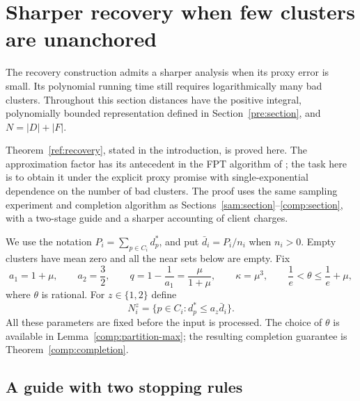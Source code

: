 \section{Sharper recovery when few clusters are unanchored}
\label{ref:section}

The recovery construction admits a sharper analysis when its proxy error is
small.  Its polynomial running time still requires logarithmically many bad
clusters.  Throughout this section distances have the positive integral,
polynomially bounded representation defined in Section~\ref{pre:section}, and
$N=|D|+|F|$.

Theorem~\ref{ref:recovery}, stated in the introduction, is proved here.
The approximation factor has its antecedent in the FPT algorithm of
\cite[Section~2.3]{CGKLL2019}; the task here is to obtain it under the
explicit proxy promise with single-exponential dependence on the number
of bad clusters.  The proof uses the same sampling experiment and
completion algorithm as Sections~\ref{sam:section}--\ref{comp:section},
with a two-stage guide and a sharper accounting of client charges.


We use the notation $P_i=\sum_{p\in C_i}d_p^*$, and put
$\bar d_i=P_i/n_i$ when $n_i>0$.  Empty clusters have mean zero and all the
near sets below are empty.  Fix
\begin{equation}\label{ref:parameters}
 a_1=1+\mu,\qquad a_2=\frac32,\qquad
 q=1-\frac1{a_1}=\frac{\mu}{1+\mu},\qquad
 \kappa=\mu^3,
 \qquad \frac1e<\theta\le\frac1e+\mu,
\end{equation}
where $\theta$ is rational.  For $z\in\{1,2\}$ define
\[
 N_i^z=\{p\in C_i:d_p^*\le a_z\bar d_i\}.
\]
All these parameters are fixed before the input is processed.  The choice of
$\theta$ is available in Lemma~\ref{comp:partition-max}; the resulting
completion guarantee is Theorem~\ref{comp:completion}.

\subsection{A guide with two stopping rules}


